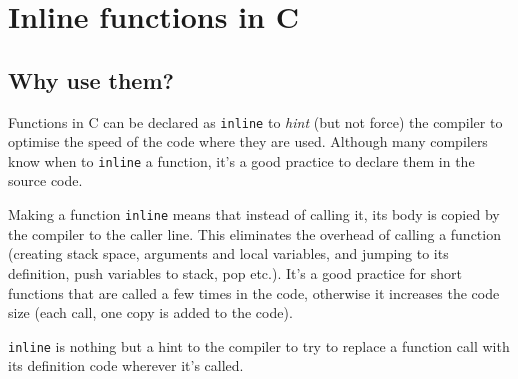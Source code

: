 



\section{Inline functions in C}


\subsection{Why use them?}

Functions in C can be declared as \texttt{inline} to \textit{hint}  (but not force) the compiler to optimise the speed of the code where they are used. Although many compilers know when to \texttt{inline} a function, it's a good practice to declare them in the source code.

Making a function \texttt{inline} means that instead of calling it, its body is copied by the compiler to the caller line. This eliminates the overhead of calling a function (creating stack space, arguments and local variables, and jumping to its definition, push variables to stack, pop etc.). It's a good practice for short functions that are called a few times in the code, otherwise it increases the code size (each call, one copy is added to the code).

\begin{takeaway}
\textup{\texttt{inline}} is nothing but a hint to the compiler to try to replace a function call with its definition code wherever it's called.
\end{takeaway}

